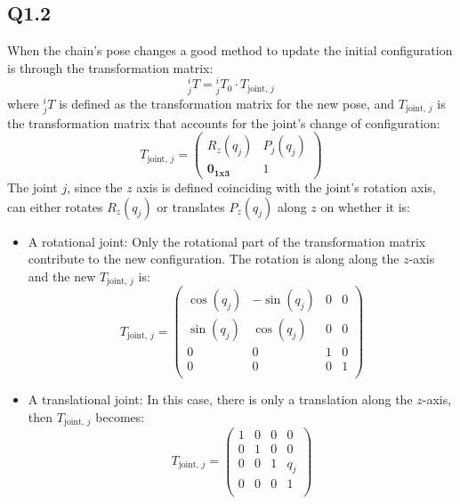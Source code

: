 \subsection{Q1.2}
When the chain's pose changes a good method to update the initial configuration is through the transformation matrix:
\begin{equation}
	{}^i_j T = {}^i_j T_0 \cdot T_{\text{joint},\,j}
\end{equation}
where $^i_j T$ is defined as the transformation matrix for the new pose, and $T_{\text{joint},\,j}$ is the transformation matrix that accounts for the joint’s change of configuration:
\begin{equation}
	T_{\text{joint},\,j} = \begin{pmatrix}
		R_{z}(q_{j}) & P_j(q_{j}) \\
		\mathbf{0_{1x3}} & 1
	\end{pmatrix}
\end{equation}
The joint $j$, since the $z$ axis is defined coinciding with the joint's rotation axis, can either rotates $R_{z}(q_{j})$ or translates $P_{z}(q_{j})$ along $z$ on whether it is:
	\begin{itemize}
		\item A rotational joint: Only the rotational part of the transformation matrix contribute to the new configuration. The rotation is along along the $z$-axis and the new $T_{\text{joint},\,j}$ is:
		\begin{equation*}
			T_{\text{joint},\,j} = \begin{pmatrix}
				\cos(q_j) & -\sin(q_j) & 0 & 0 \\
				\sin(q_j) & \cos(q_j) & 0 & 0 \\
				0 & 0 & 1 & 0 \\
				0 & 0 & 0 & 1 \\
			\end{pmatrix} 
		\end{equation*}
		\item A translational joint: In this case, there is only a translation along the $z$-axis, then $T_{\text{joint},\,j}$ becomes:
		\begin{equation*}
		T_{\text{joint},\,j} = \begin{pmatrix}
			1 & 0 & 0 & 0 \\
			0 & 1 & 0 & 0 \\
			0 & 0 & 1 & q_j \\
			0 & 0 & 0 & 1 \\
		\end{pmatrix} 
		\end{equation*}
	\end{itemize}
